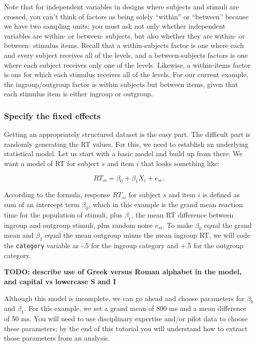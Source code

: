 \documentclass[doc,floatsintext]{apa6}
\begin{document}
Note that for independent variables in designs where subjects and
stimuli are crossed, you can't think of factors as being solely
\enquote{within} or \enquote{between} because we have two sampling
units; you must ask not only whether independent variables are within-
or between- subjects, but also whether they are within- or between-
stimulus items. Recall that a within-subjects factor is one where each
and every subject receives all of the levels, and a between-subjects
factors is one where each subject receives only one of the levels.
Likewise, a within-items factor is one for which each stimulus receives
all of the levels. For our current example, the ingroup/outgroup factor
is within subjects but between items, given that each stimulus item is
either ingroup or outgroup.

\subsubsection{Specify the fixed
effects}\label{specify-the-fixed-effects}

Getting an appropriately structured dataset is the easy part. The
difficult part is randomly generating the RT values. For this, we need
to establish an underlying statistical model. Let us start with a basic
model and build up from there. We want a model of RT for subject \(s\)
and item \(i\) that looks something like:

\begin{equation}
RT_{si} = \beta_0 + \beta_1 X_{i} + e_{si}.
\end{equation}

\noindent According to the formula, response \(RT_{si}\) for subject
\(s\) and item \(i\) is defined as sum of an intercept term \(\beta_0\),
which in this example is the grand mean reaction time for the population
of stimuli, plus \(\beta_1\), the mean RT difference between ingroup and
outgroup stimuli, plus random noise \(e_{si}\). To make \(\beta_0\)
equal the grand mean and \(\beta_1\) equal the mean outgroup minus the
mean ingroup RT, we will code the \texttt{category} variable as -.5 for
the ingroup category and +.5 for the outgroup category.

\textbf{TODO: describe use of Greek versus Roman alphabet in the model,
and capital vs lowercase S and I}

Although this model is incomplete, we can go ahead and choose parameters
for \(\beta_0\) and \(\beta_1\). For this example, we set a grand mean
of 800 ms and a mean difference of 50 ms. You will need to use
disciplinary expertise and/or pilot data to choose these parameters; by
the end of this tutorial you will understand how to extract those
parameters from an analysis.
\end{document}

